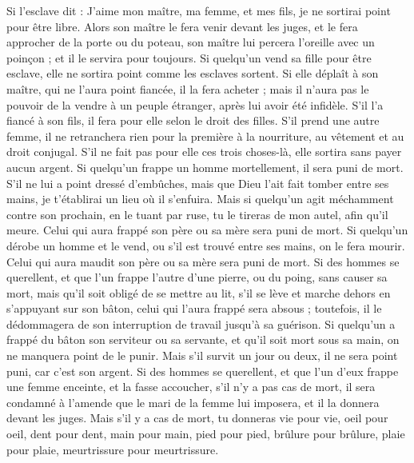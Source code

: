 \begin{multicols}{2}
Si l'esclave dit : J'aime mon maître, ma femme, et mes fils, je ne sortirai point pour être libre.
Alors son maître le fera venir devant les juges, et le fera approcher de la porte ou du poteau, son maître lui percera l'oreille avec un poinçon ; et il le servira pour toujours.
Si quelqu'un vend sa fille pour être esclave, elle ne sortira point comme les esclaves sortent.
Si elle déplaît à son maître, qui ne l'aura point fiancée, il la fera acheter ; mais il n'aura pas le pouvoir de la vendre à un peuple étranger, après lui avoir été infidèle.
S'il l'a fiancé à son fils, il fera pour elle selon le droit des filles.
S’il prend une autre femme, il ne retranchera rien pour la première à la nourriture, au vêtement et au droit conjugal.
S'il ne fait pas pour elle ces trois choses-là, elle sortira sans payer aucun argent.
Si quelqu'un frappe un homme mortellement, il sera puni de mort.
S'il ne lui a point dressé d'embûches, mais que Dieu l'ait fait tomber entre ses mains, je t'établirai un lieu où il s'enfuira.
Mais si quelqu'un agit méchamment contre son prochain, en le tuant par ruse, tu le tireras de mon autel, afin qu'il meure.
Celui qui aura frappé son père ou sa mère sera puni de mort.
Si quelqu'un dérobe un homme et le vend, ou s'il est trouvé entre ses mains, on le fera mourir.
Celui qui aura maudit son père ou sa mère sera puni de mort.
Si des hommes se querellent, et que l'un frappe l'autre d'une pierre, ou du poing, sans causer sa mort, mais qu'il soit obligé de se mettre au lit,
s'il se lève et marche dehors en s'appuyant sur son bâton, celui qui l'aura frappé sera absous ; toutefois, il le dédommagera de son interruption de travail jusqu’à sa guérison.
Si quelqu'un a frappé du bâton son serviteur ou sa servante, et qu'il soit mort sous sa main, on ne manquera point de le punir.
Mais s'il survit un jour ou deux, il ne sera point puni, car c'est son argent.
Si des hommes se querellent, et que l'un d'eux frappe une femme enceinte, et la fasse accoucher, s'il n'y a pas cas de mort, il sera condamné à l'amende que le mari de la femme lui imposera, et il la donnera devant les juges.
Mais s'il y a cas de mort, tu donneras vie pour vie,
oeil pour oeil, dent pour dent, main pour main, pied pour pied,
brûlure pour brûlure, plaie pour plaie, meurtrissure pour meurtrissure.

\end{multicols}

